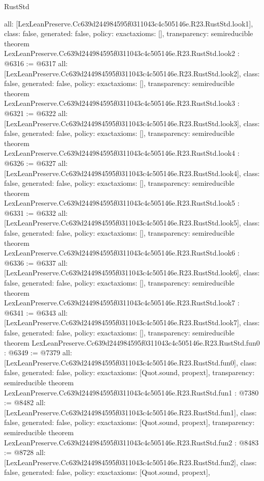 \begin{lexlean}{RustStd}
\begin{coremodule}
{  all: [LexLeanPreserve.Cc639d244984595f0311043c4c505146e.R23.RustStd.look1],
  class: false,
  generated: false,
  policy: exact{axioms: []},
  transparency: semireducible
}
theorem LexLeanPreserve.Cc639d244984595f0311043c4c505146e.R23.RustStd.look2 : @6316 := @6317 {
  all: [LexLeanPreserve.Cc639d244984595f0311043c4c505146e.R23.RustStd.look2],
  class: false,
  generated: false,
  policy: exact{axioms: []},
  transparency: semireducible
}
theorem LexLeanPreserve.Cc639d244984595f0311043c4c505146e.R23.RustStd.look3 : @6321 := @6322 {
  all: [LexLeanPreserve.Cc639d244984595f0311043c4c505146e.R23.RustStd.look3],
  class: false,
  generated: false,
  policy: exact{axioms: []},
  transparency: semireducible
}
theorem LexLeanPreserve.Cc639d244984595f0311043c4c505146e.R23.RustStd.look4 : @6326 := @6327 {
  all: [LexLeanPreserve.Cc639d244984595f0311043c4c505146e.R23.RustStd.look4],
  class: false,
  generated: false,
  policy: exact{axioms: []},
  transparency: semireducible
}
theorem LexLeanPreserve.Cc639d244984595f0311043c4c505146e.R23.RustStd.look5 : @6331 := @6332 {
  all: [LexLeanPreserve.Cc639d244984595f0311043c4c505146e.R23.RustStd.look5],
  class: false,
  generated: false,
  policy: exact{axioms: []},
  transparency: semireducible
}
theorem LexLeanPreserve.Cc639d244984595f0311043c4c505146e.R23.RustStd.look6 : @6336 := @6337 {
  all: [LexLeanPreserve.Cc639d244984595f0311043c4c505146e.R23.RustStd.look6],
  class: false,
  generated: false,
  policy: exact{axioms: []},
  transparency: semireducible
}
theorem LexLeanPreserve.Cc639d244984595f0311043c4c505146e.R23.RustStd.look7 : @6341 := @6343 {
  all: [LexLeanPreserve.Cc639d244984595f0311043c4c505146e.R23.RustStd.look7],
  class: false,
  generated: false,
  policy: exact{axioms: []},
  transparency: semireducible
}
theorem LexLeanPreserve.Cc639d244984595f0311043c4c505146e.R23.RustStd.fun0 : @6349 := @7379 {
  all: [LexLeanPreserve.Cc639d244984595f0311043c4c505146e.R23.RustStd.fun0],
  class: false,
  generated: false,
  policy: exact{axioms: [Quot.sound, propext]},
  transparency: semireducible
}
theorem LexLeanPreserve.Cc639d244984595f0311043c4c505146e.R23.RustStd.fun1 : @7380 := @8482 {
  all: [LexLeanPreserve.Cc639d244984595f0311043c4c505146e.R23.RustStd.fun1],
  class: false,
  generated: false,
  policy: exact{axioms: [Quot.sound, propext]},
  transparency: semireducible
}
theorem LexLeanPreserve.Cc639d244984595f0311043c4c505146e.R23.RustStd.fun2 : @8483 := @8728 {
  all: [LexLeanPreserve.Cc639d244984595f0311043c4c505146e.R23.RustStd.fun2],
  class: false,
  generated: false,
  policy: exact{axioms: [Quot.sound, propext]},
}
\end{coremodule}
\end{lexlean}
